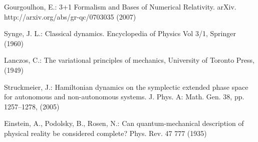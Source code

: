 \documentclass[smallextended]{svjour3}
\numberwithin{equation}{section}
\theoremstyle{definition}
\begin{document}
\begin{thebibliography}{0}
 Gourgoulhon, E.: 3+1 Formalism and Bases of Numerical Relativity. arXiv. http://arxiv.org/abs/gr-qc/0703035 (2007)

 Synge, J. L.: Classical dynamics. Encyclopedia of Physics Vol 3/1, Springer (1960)

 Lanczos, C.: The variational principles of mechanics, University of Toronto Press, (1949)

 Struckmeier, J.: Hamiltonian dynamics on the symplectic extended phase space for autonomous and non-autonomous systems. J. Phys. A: Math. Gen. 38, pp. 1257--1278, (2005)

 Einstein, A., Podolsky, B.,  Rosen, N.: Can quantum-mechanical description of physical reality be considered complete? Phys. Rev. 47 777 (1935)

\end{thebibliography}
\end{document}
